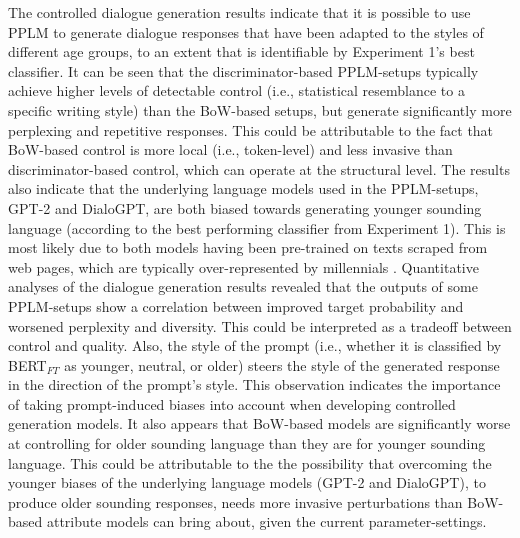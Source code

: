 The controlled dialogue generation results indicate that it is possible to use PPLM to generate dialogue responses that have been adapted to the styles of different age groups, to an extent that is identifiable by Experiment 1's best classifier. It can be seen that the discriminator-based PPLM-setups typically achieve higher levels of detectable control (i.e., statistical resemblance to a specific writing style) than the BoW-based setups, but generate significantly more perplexing and repetitive responses. This could be attributable to the fact that BoW-based control is more local (i.e., token-level) and less invasive than discriminator-based control, which can operate at the structural level. The results also indicate that the underlying language models used in the PPLM-setups, GPT-2 and DialoGPT, are both biased towards generating younger sounding language (according to the best performing classifier from Experiment 1). This is most likely due to both models having been pre-trained on texts scraped from web pages, which are typically over-represented by millennials \citep{radford2019language, zhang2019dialogpt}. 
Quantitative analyses of the dialogue generation results revealed that the outputs of some PPLM-setups show a correlation between improved target probability and worsened perplexity and diversity. This could be interpreted as a tradeoff between control and quality.
Also, the style of the prompt (i.e., whether it is classified by BERT$_{FT}$ as younger, neutral, or older) steers the style of the generated response in the direction of the prompt's style. This observation indicates the importance of taking prompt-induced biases into account when developing controlled generation models. It also appears that BoW-based models are significantly worse at controlling for older sounding language than they are for younger sounding language.
This could be attributable to the the possibility that overcoming the younger biases of the underlying language models (GPT-2 and DialoGPT), to produce older sounding responses, needs more invasive perturbations than BoW-based attribute models can bring about, given the current parameter-settings.
